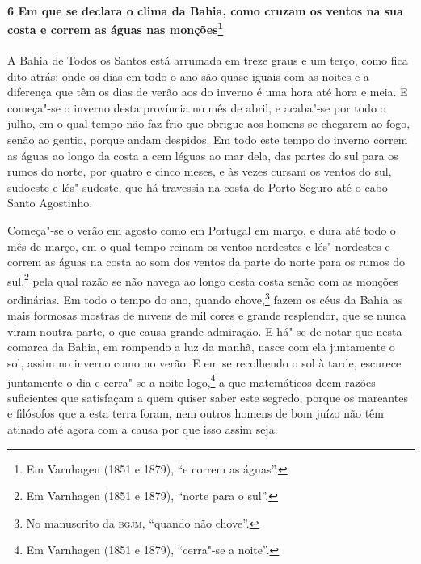 \begin{linenumbers}
\paragraph{6 Em que se declara o clima da Bahia, como cruzam os ventos na sua costa e
correm as águas nas monções\protect\footnote{ Em Varnhagen (1851 e 1879), ``e correm as
águas''.}} \quad
A Bahia de Todos os Santos está arrumada em treze graus e um terço, como fica dito atrás;
onde os dias em todo o ano são quase iguais com as noites e a diferença que têm os dias de
verão aos do inverno é uma hora até hora e meia. E começa"-se o inverno desta província no
mês de abril, e acaba"-se por todo o julho, em o qual tempo não faz frio que obrigue aos
homens se chegarem ao fogo, senão ao gentio, porque andam despidos. Em todo este tempo do
inverno correm as águas ao longo da costa a cem léguas ao mar dela, das partes do sul para
os rumos do norte, por quatro e cinco meses, e às vezes cursam os ventos do sul, sudoeste
e lés"-sudeste, que há travessia na costa de Porto Seguro até o cabo Santo Agostinho.

Começa"-se o verão em agosto como em Portugal em março, e dura até todo o mês de março, em
o qual tempo reinam os ventos nordestes e lés"-nordestes e correm as águas na costa ao som
dos ventos da parte do norte para os rumos do sul,\footnote{ Em Varnhagen (1851 e 1879),
``norte para o sul''.} pela qual razão se não navega ao longo desta costa senão com as
monções ordinárias. Em todo o tempo do ano, quando chove,\footnote{ No manuscrito da
\textsc{bgjm}, ``quando não chove''.} fazem os céus da Bahia as mais formosas mostras de
nuvens de mil cores e grande resplendor, que se nunca viram noutra parte, o que causa
grande admiração. E há"-se de notar que nesta comarca da Bahia, em rompendo a luz da manhã,
nasce com ela juntamente o sol, assim no inverno como no verão. E em se recolhendo o sol à
tarde, escurece juntamente o dia e cerra"-se a noite logo,\footnote{ Em Varnhagen (1851 e
1879), ``cerra"-se a noite''.} a que matemáticos deem razões suficientes que satisfaçam a
quem quiser saber este segredo, porque os mareantes e filósofos que a esta terra foram,
nem outros homens de bom juízo não têm atinado até agora com a causa por que isso assim
seja.


\end{linenumbers}
